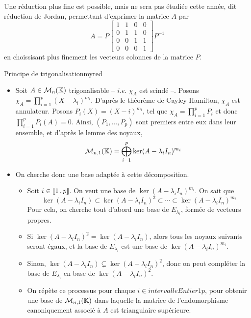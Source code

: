     Une réduction plus fine est possible, mais ne sera pas étudiée cette année, dit réduction de Jordan, permettant d’exprimer la matrice $A$ par 
    \[ A = P \begin{bmatrix}
        1 & 1 & 0 & 0 \\
        0 & 1 & 1 & 0 \\
        0 & 0 & 1 & 1 \\
        0 & 0 & 0 & 1
    \end{bmatrix} P^{-1} \]   
    en choissisant plus finement les vecteurs colonnes de la matrice $P$.

    \begin{omed}{Principe de trigonalisation}{myred}
        \begin{itemize}
            \item Soit $A \in \mathcal{M}_{n}(\mathbb{K})$ trigonalisable -- \textit{i.e.} $\chi_A$ est scindé --. Posons $\chi_A = \prod_{i=1}^{p} (X - \lambda_i)^{m_i}$. D’après le théorème de Cayley-Hamilton, $\chi_A$ est annulateur. Posons $P_i(X) = (X - i)^{m_i}$, tel que $\chi_A = \prod_{i=1}^{p} P_i$ et donc $\prod_{i=1}^{p} P_i(A) = 0$. Ainsi, $(P_1,\ldots,P_p)$ sont premiers entre eux dans leur ensemble, et d’après le lemme des noyaux, 
        \[ \mathcal{M}_{n,1}(\mathbb{K}) = \bigoplus_{i=1}^p \ker(A - \lambda_i I_n)^{m_i} \]   
            \item On cherche donc une base adaptée à cette décomposition. 
            \begin{itemize}
                \item Soit $i \in \left\llbracket 1 \, , p \right\rrbracket$. On veut une base de $\ker(A - \lambda_i I_n)^{m_i}$. On sait que 
                \[ \ker(A - \lambda_i I_n) \subset \ker(A - \lambda_i I_n)^2 \subset \cdots \subset \ker(A -\lambda_i I_n)^{m_i} \]
                Pour cela, on cherche tout d’abord une base de $E_{\lambda_i}$, formée de vecteurs propres.
                \item Si $\ker(A - \lambda_i I_n)^2 = \ker(A - \lambda_i I_n)$, alors tous les noyaux suivants seront égaux, et la base de $E_{\lambda_i}$ est une base de $\ker(A - \lambda_i I_n)^{m_i}$.
                \item Sinon, $\ker(A - \lambda_i I_n) \subsetneq \ker(A - \lambda_i I_n)^2$, donc on peut compléter la base de $E_{\lambda_i}$ en base de $\ker(A - \lambda_i I_n)^2$.
                \item On répète ce processus pour chaque $i \in intervalleEntier{1}{p}$, pour obtenir une base de $\mathcal{M}_{n,1}(\mathbb{K})$ dans laquelle la matrice de l’endomorphisme canoniquement associé à $A$ est triangulaire supérieure.
            \end{itemize}
        \end{itemize}
    \end{omed}

